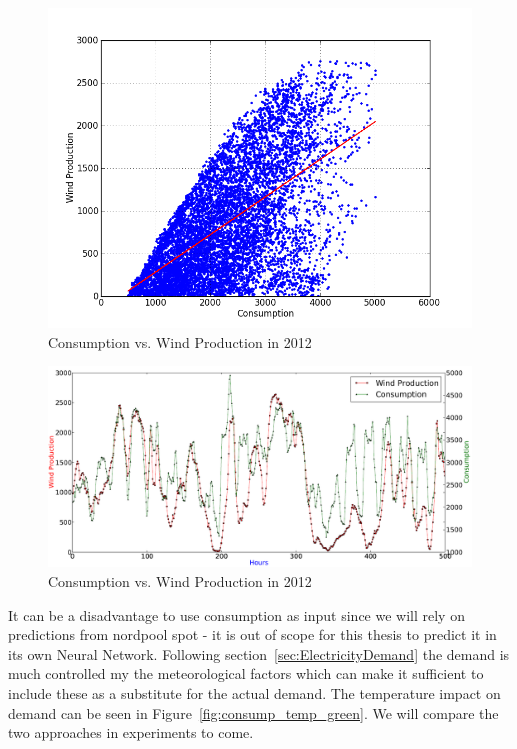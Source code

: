 \begin{figure}[H]
\centering
\includegraphics[width=0.99\linewidth,natwidth=898,natheight=587]{billeder/consumptionVsWindProduction.png}
\caption{Consumption vs. Wind Production in 2012}
\label{fig:consumptionVsWindProduction}
\end{figure}

\begin{figure}[H]
\centering
\includegraphics[width=0.99\linewidth,natwidth=898,natheight=587]{billeder/windProductionAndConsumptionPlot.png}
\caption{Consumption vs. Wind Production in 2012}
\label{fig:windProductionAndConsumptionPlot}
\end{figure}

It can be a disadvantage to use consumption as input since we will rely on predictions from nordpool spot - it is out of scope for this thesis to predict it in its own Neural Network. Following section~\ref{sec:ElectricityDemand} the demand is much controlled my the meteorological factors which can make it sufficient to include these as a substitute for the actual demand. The temperature impact on demand can be seen in Figure~\ref{fig:consump_temp_green}. We will compare the two approaches in experiments to come.

